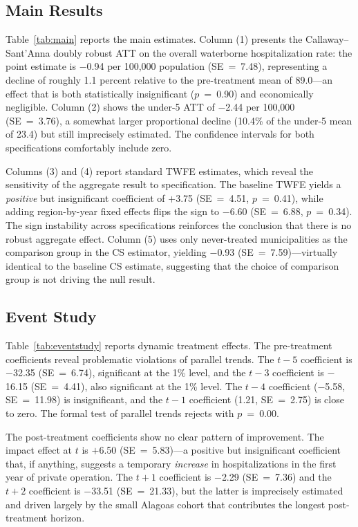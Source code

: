 \documentclass[12pt]{article}
\begin{document}
\subsection{Main Results}



Table~\ref{tab:main} reports the main estimates. Column (1) presents the Callaway--Sant'Anna doubly robust ATT on the overall waterborne hospitalization rate: the point estimate is $-$0.94 per 100,000 population (SE~=~7.48), representing a decline of roughly 1.1 percent relative to the pre-treatment mean of 89.0---an effect that is both statistically insignificant ($p$~=~0.90) and economically negligible. Column (2) shows the under-5 ATT of $-$2.44 per 100,000 (SE~=~3.76), a somewhat larger proportional decline (10.4\% of the under-5 mean of 23.4) but still imprecisely estimated. The confidence intervals for both specifications comfortably include zero.

Columns (3) and (4) report standard TWFE estimates, which reveal the sensitivity of the aggregate result to specification. The baseline TWFE yields a \textit{positive} but insignificant coefficient of $+$3.75 (SE~=~4.51, $p$~=~0.41), while adding region-by-year fixed effects flips the sign to $-$6.60 (SE~=~6.88, $p$~=~0.34). The sign instability across specifications reinforces the conclusion that there is no robust aggregate effect. Column (5) uses only never-treated municipalities as the comparison group in the CS estimator, yielding $-$0.93 (SE~=~7.59)---virtually identical to the baseline CS estimate, suggesting that the choice of comparison group is not driving the null result.

\subsection{Event Study}
\label{sec:event_study}



Table~\ref{tab:eventstudy} reports dynamic treatment effects. The pre-treatment coefficients reveal problematic violations of parallel trends. The $t-5$ coefficient is $-$32.35 (SE~=~6.74), significant at the 1\% level, and the $t-3$ coefficient is $-$16.15 (SE~=~4.41), also significant at the 1\% level. The $t-4$ coefficient ($-$5.58, SE~=~11.98) is insignificant, and the $t-1$ coefficient (1.21, SE~=~2.75) is close to zero. The formal test of parallel trends rejects with $p$~=~0.00.

The post-treatment coefficients show no clear pattern of improvement. The impact effect at $t$ is $+$6.50 (SE~=~5.83)---a positive but insignificant coefficient that, if anything, suggests a temporary \textit{increase} in hospitalizations in the first year of private operation. The $t+1$ coefficient is $-$2.29 (SE~=~7.36) and the $t+2$ coefficient is $-$33.51 (SE~=~21.33), but the latter is imprecisely estimated and driven largely by the small Alagoas cohort that contributes the longest post-treatment horizon.
\end{document}
